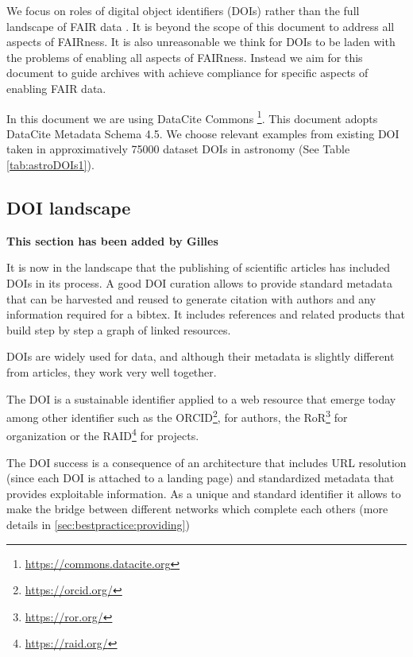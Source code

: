 \documentclass[11pt,a4paper]{ivoa}
\begin{document}
We focus on roles of digital object identifiers (DOIs) rather than the full landscape of FAIR data \citep[e.g.,][]{Wilkinson2016}. 
It is beyond the scope of this document to address all aspects of FAIRness.
It is also unreasonable we think for DOIs to be laden with the problems of enabling all aspects of FAIRness. 
Instead we aim for this document to guide archives with achieve compliance for specific aspects of enabling FAIR data.


In this document we are using DataCite Commons  \footnote{\url{https://commons.datacite.org}}. This document adopts DataCite Metadata Schema 4.5.
We choose relevant examples from existing DOI taken in approximatively 75000 dataset DOIs in astronomy (See Table \ref{tab:astroDOIs1}). 



\subsection{DOI landscape}
\textbf{\color{red}This section has been added by Gilles}

It is now in the landscape that the publishing of scientific articles has included DOIs in its process. A good DOI curation allows to provide standard metadata that can be harvested and reused to generate citation with authors and any information required for a bibtex. It includes references and related products that build step by step a graph of linked resources.

DOIs are widely used for data, and although their metadata is slightly different from articles, they work very well together.


The DOI is a sustainable identifier applied to a web resource that emerge today among other identifier such  as the ORCID\footnote{\url{https://orcid.org/}}, for authors, the RoR\footnote{\url{https://ror.org/}} for organization or the RAID\footnote{\url{https://raid.org/}} for projects.

The DOI success is a consequence of an architecture that includes URL resolution (since each DOI is attached to a landing page) and standardized metadata that provides exploitable information. As a unique and standard identifier it allows to make the bridge between different networks which complete each others (more details in \ref{sec:bestpractice:providing})
\end{document}
